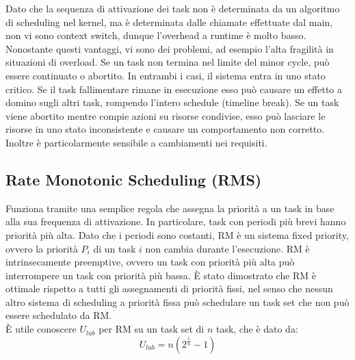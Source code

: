 \documentclass[12pt]{article}
\begin{document}
Dato che la sequenza di attivazione dei task non è determinata da un algoritmo di scheduling nel kernel, ma è determinata dalle chiamate effettuate dal main, non vi sono context switch, dunque l'overhead a runtime è molto basso.
Nonostante questi vantaggi, vi sono dei problemi, ad esempio l'alta fragilità in situazioni di overload. Se un task non termina nel limite del minor cycle, può essere continuato o abortito.
In entrambi i casi, il sistema entra in uno stato critico.
Se il task fallimentare rimane in esecuzione esso può causare un effetto a domino sugli altri task, rompendo l'intero schedule (timeline break).
Se un task viene abortito mentre compie azioni su risorse condivise, esso può lasciare le risorse in uno stato inconsistente e causare un comportamento non corretto.
Inoltre è particolarmente sensibile a cambiamenti nei requisiti.
\subsection{Rate Monotonic Scheduling (RMS)}
Funziona tramite una semplice regola che assegna la priorità a un task in base alla sua frequenza di attivazione.
In particolare, task con periodi più brevi hanno priorità più alta.
Dato che i periodi sono costanti, RM è un sistema fixed priority, ovvero la priorità $P_i$ di un task $i$ non cambia durante l'esecuzione.
RM è intrinsecamente preemptive, ovvero un task con priorità più alta può interrompere un task con priorità più bassa.
È stato dimostrato che RM è ottimale rispetto a tutti gli assegnamenti di priorità fissi, nel senso che nessun altro sistema di scheduling a priorità fissa può schedulare un task set che non può essere schedulato da RM.
\\
È utile conoscere $U_{lub}$ per RM su un task set di $n$ task, che è dato da:
\begin{equation}
    U_{lub} = n(2^{\frac{1}{n}}-1)
\end{equation}
\begin{table}[H]
    \centering
    \qquad
    \caption{Valori di $U_{lub}$ per RM al variare di n} 
\end{table}
\end{document}
